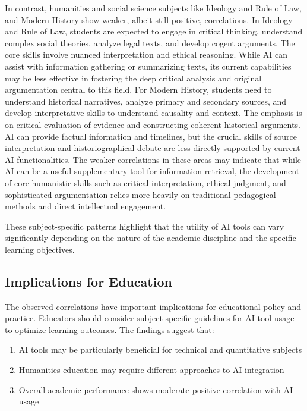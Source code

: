 \documentclass[manuscript,screen,review]{acmart}
\begin{document}
In contrast, humanities and social science subjects like Ideology and Rule of Law, and Modern History show weaker, albeit still positive, correlations.
In Ideology and Rule of Law, students are expected to engage in critical thinking, understand complex social theories, analyze legal texts, and develop cogent arguments. The core skills involve nuanced interpretation and ethical reasoning. While AI can assist with information gathering or summarizing texts, its current capabilities may be less effective in fostering the deep critical analysis and original argumentation central to this field.
For Modern History, students need to understand historical narratives, analyze primary and secondary sources, and develop interpretative skills to understand causality and context. The emphasis is on critical evaluation of evidence and constructing coherent historical arguments. AI can provide factual information and timelines, but the crucial skills of source interpretation and historiographical debate are less directly supported by current AI functionalities.
The weaker correlations in these areas may indicate that while AI can be a useful supplementary tool for information retrieval, the development of core humanistic skills such as critical interpretation, ethical judgment, and sophisticated argumentation relies more heavily on traditional pedagogical methods and direct intellectual engagement.

These subject-specific patterns highlight that the utility of AI tools can vary significantly depending on the nature of the academic discipline and the specific learning objectives.

\subsection{Implications for Education}

The observed correlations have important implications for educational policy and practice. Educators should consider subject-specific guidelines for AI tool usage to optimize learning outcomes. The findings suggest that:

\begin{enumerate}
\item AI tools may be particularly beneficial for technical and quantitative subjects
\item Humanities education may require different approaches to AI integration
\item Overall academic performance shows moderate positive correlation with AI usage
\end{enumerate}
\end{document}
